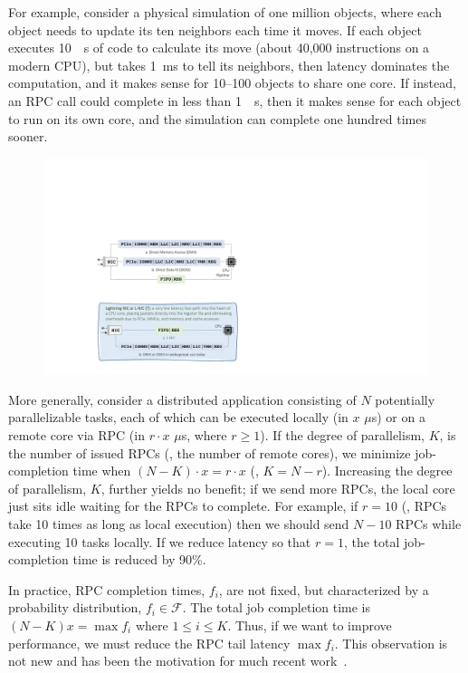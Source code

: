 For example, consider a physical simulation of one million objects, where each object needs to update its ten neighbors each time it moves. 
If each object executes \SI{10}{\mu s} of code to calculate its move (about 40,000 instructions on a modern CPU), but takes \SI{1}{ms} to tell its neighbors, then latency dominates the computation, and it makes sense for 10--100 objects to share one core. 
If instead, an RPC call could complete in less than \SI{1}{\mu s}, then it makes sense for each object to run on its own core, and the simulation can complete one hundred times sooner. 

\begin{figure}[t]
  \includegraphics[width=\linewidth]{./figures/lnic-fbox}
  \label{fig:lnic-fbox}
\end{figure}

More generally, consider a distributed application consisting of $N$ potentially parallelizable tasks, each of which can be executed locally (in $x$ $\mu$s) or on a remote core via RPC (in $r \cdot x$ $\mu$s, where $r \ge 1$). 
If the degree of parallelism, $K$, is the number of issued RPCs (\ie, the number of remote cores), we minimize job-completion time when $(N - K)\cdot x = r \cdot x$ (\ie, $K = N - r$). 
Increasing the degree of parallelism, $K$, further yields no benefit; if we send more RPCs, the local core just sits idle waiting for the RPCs to complete. 
For example, if $r = 10$ (\ie, RPCs take 10 times as long as local execution) then we should send $N-10$ RPCs while executing 10 tasks locally. 
If we reduce latency so that $r=1$, the total job-completion time is reduced by 90\%.  

In practice, RPC completion times, $f_i$, are not fixed, but characterized by a probability distribution, $f_i \in \mathcal{F}$. 
The total job completion time is $(N - K)x =\max{f_i}$ where $1\le i \le K$. Thus, if we want to improve performance, we must reduce the RPC tail latency $\max{f_i}$. 
This observation is not new and has been the motivation for much recent work~\cite{shinjuku, shenango, rpcvalet}. 

